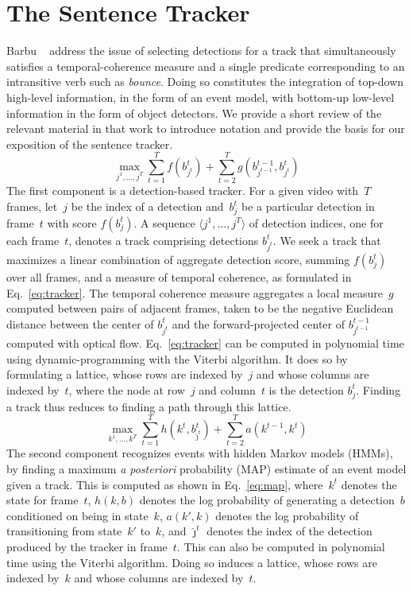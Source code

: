 \section{The Sentence Tracker}
\label{sec-st1:tracker}

Barbu \etal\ \cite{Barbu2012b} address the issue of selecting detections
for a track that simultaneously satisfies a temporal-coherence measure and a
single predicate corresponding to an intransitive verb such as \emph{bounce}.
%
Doing so constitutes the integration of top-down high-level information, in the
form of an event model, with bottom-up low-level information in the form of
object detectors.
%
We provide a short review of the relevant material in that work to introduce
notation and provide the basis for our exposition of the sentence tracker.
%
\begin{equation}
  \max_{j^1,\ldots,j^T}
  \sum_{t=1}^Tf(b^t_{j^t})+\sum_{t=2}^Tg(b^{t-1}_{j^{t-1}},b^t_{j^t})
  \label{eq:tracker}
\end{equation}
%
The first component is a detection-based tracker.
%
For a given video with~$T$ frames, let~$j$ be the index of a detection
and~$b^t_j$ be a particular detection in frame~$t$ with score $f(b^t_j)$.
%
A sequence $\langle j^1,\ldots,j^T\rangle$ of detection indices, one for each
frame~$t$, denotes a track comprising detections $b^t_{j^t}$.
%
We seek a track that maximizes a linear combination of aggregate detection
score, summing $f(b^t_j)$ over all frames, and a measure of temporal coherence,
as formulated in Eq.~\ref{eq:tracker}.
%
The temporal coherence measure aggregates a local measure~$g$ computed between
pairs of adjacent frames, taken to be the negative Euclidean distance between
the center of $b^t_{j^t}$ and the forward-projected center of
$b^{t-1}_{j^{t-1}}$ computed with optical flow.
%
Eq.~\ref{eq:tracker} can be computed in polynomial time using
dynamic-programming with the Viterbi \cite{Viterbi1971} algorithm.
%
It does so by formulating a lattice, whose rows are indexed by~$j$ and whose
columns are indexed by~$t$, where the node at row~$j$ and column~$t$ is the
detection $b^t_j$.
%
Finding a track thus reduces to finding a path through this lattice.
%
\begin{equation}
  \max_{k^1,\ldots,k^T}
  \sum_{t=1}^Th(k^t,b^t_{\hat{\jmath}^t})+\sum_{t=2}^Ta(k^{t-1},k^t)
  \label{eq:map}
\end{equation}
%
The second component recognizes events with hidden Markov models (HMMs), by
finding a maximum \emph{a posteriori} probability (MAP) estimate of an event
model given a track.
%
This is computed as shown in Eq.~\ref{eq:map}, where~$k^t$ denotes the
state for frame~$t$, $h(k,b)$ denotes the log probability of generating a
detection~$b$ conditioned on being in state~$k$, $a(k',k)$ denotes the log
probability of transitioning from state~$k'$ to~$k$, and $\hat{\jmath}^t$
denotes the index of the detection produced by the tracker in frame~$t$.
%
This can also be computed in polynomial time using the Viterbi algorithm.
%
Doing so induces a lattice, whose rows are indexed by~$k$ and whose columns are
indexed by~$t$.

